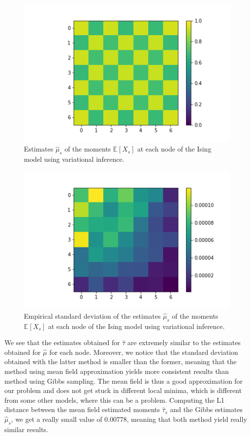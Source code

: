 \documentclass[11pt]{article}
\newcommand{\Expect}[2][]{\mathbb{E}_{#1}\!\left[#2 \right]}
\begin{document}
\begin{description}
\begin{figure}[htbp]
\begin{center}
\includegraphics[scale=0.6]{figures/grid_mean_field.png}
\caption{Estimates $\hat{\mu}_s$ of the moments $\Expect{X_s}$ at each node of the Ising model using variational inference.}
\label{fig:mean_field_mean}
\end{center}
\end{figure}

\begin{figure}[htbp]
\begin{center}
\includegraphics[scale=0.6]{figures/stddev_mean_field.png}
\caption{Empirical standard deviation of the estimates $\hat{\mu}_s$ of the moments $\Expect{X_s}$ at each node of the Ising model using variational inference.}
\label{fig:mean_field_std}
\end{center}
\end{figure}

We see that the estimates obtained for $\hat{\tau}$ are extremely similar to the estimates obtained for $\hat{\mu}$ for each node. Moreover, we notice that the standard deviation obtained with the latter method is smaller than the former, meaning that the method using mean field approximation yields more consistent results than method using Gibbs sampling. The mean field is thus a good approximation for our problem and does not get stuck in different local minima, which is different from some other models, where this can be a problem. Computing the L1 distance between the mean field estimated moments $\hat{\tau}_s$ and the Gibbs estimates $\hat{\mu}_s$, we get a really small value of $0.00778$, meaning that both method yield really similar results.


\end{description}
\end{document}
